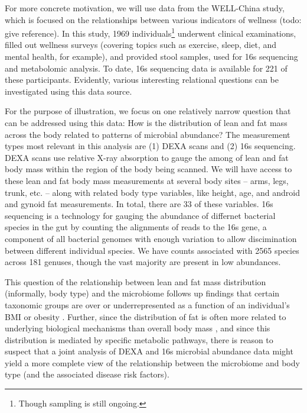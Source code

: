 \documentclass{article}
\begin{document}
For more concrete motivation, we will use data from the WELL-China study, which
is focused on the relationships between various indicators of wellness (todo:
give reference). In this study, 1969 individuals\footnote{Though sampling is
  still ongoing.} underwent clinical examinations, filled out wellness surveys
(covering topics such as exercise, sleep, diet, and mental health, for example),
and provided stool samples, used for 16s sequencing and metabolomic analysis. To
date, 16s sequencing data is available for 221 of these participants. Evidently,
various interesting relational questions can be investigated using this data
source.

For the purpose of illustration, we focus on one relatively narrow question that
can be addressed using this data: How is the distribution of lean and fat mass
across the body related to patterns of microbial abundance? The measurement
types most relevant in this analysis are (1) DEXA scans and (2) 16s sequencing.
DEXA scans use relative X-ray absorption to gauge the among of lean and fat body
mass within the region of the body being scanned. We will have access to these
lean and fat body mass measurements at several body sites -- arms, legs, trunk,
etc. -- along with related body type variables, like height, age, and android
and gynoid fat measurements. In total, there are 33 of these variables. 16s
sequencing is a technology for gauging the abundance of differnet bacterial
species in the gut by counting the alignments of reads to the 16s gene, a
component of all bacterial genomes with enough variation to allow discimination
between different individual species. We have counts associated with 2565
species across 181 genuses, though the vast majority are present in low
abundances.

This question of the relationship between lean and fat mass distribution
(informally, body type) and the microbiome follows up findings that certain
taxonomic groups are over or underrepresented as a function of an individual's
BMI or obesity \citep{ley2006microbial, turnbaugh2009core, ley2005obesity,
  ley2010obesity}. Further, since the distribution of fat is often more related
to underlying biological mechanisms than overall body mass
\citep{matsuzawa2008role}, and since this distribution is mediated by specific
metabolic pathways, there is reason to suspect that a joint analysis of DEXA and
16s microbial abundance data might yield a more complete view of the
relationship between the microbiome and body type (and the associated disease
risk factors).
\end{document}
